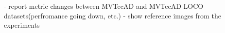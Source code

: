 - report metric changes between MVTecAD and MVTecAD LOCO datasets(perfromance going down, etc.)\newline
- show reference images from the experiments


